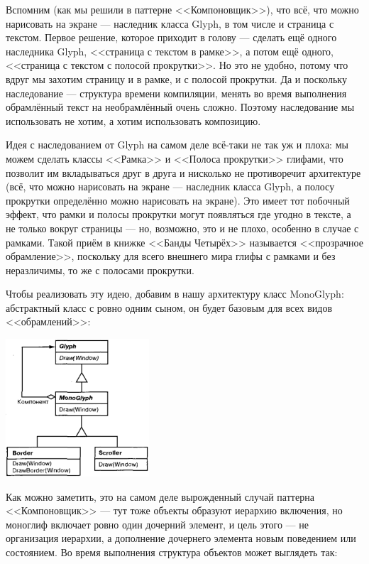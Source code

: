\documentclass{../mcstext}
\begin{document}
Вспомним (как мы решили в паттерне <<Компоновщик>>), что всё, что можно нарисовать на экране --- наследник класса Glyph, в том числе и страница с текстом. Первое решение, которое приходит в голову --- сделать ещё одного наследника Glyph, <<страница с текстом в рамке>>, а потом ещё одного, <<страница с текстом с полосой прокрутки>>. Но это не удобно, потому что вдруг мы захотим страницу и в рамке, и с полосой прокрутки. Да и поскольку наследование --- структура времени компиляции, менять во время выполнения обрамлённый текст на необрамлённый очень сложно. Поэтому наследование мы использовать не хотим, а хотим использовать композицию. 

Идея с наследованием от Glyph на самом деле всё-таки не так уж и плоха: мы можем сделать классы <<Рамка>> и <<Полоса прокрутки>> глифами, что позволит им вкладываться друг в друга и нисколько не противоречит архитектуре (всё, что можно нарисовать на экране --- наследник класса Glyph, а полосу прокрутки определённо можно нарисовать на экране). Это имеет тот побочный эффект, что рамки и полосы прокрутки могут появляться где угодно в тексте, а не только вокруг страницы --- но, возможно, это и не плохо, особенно в случае с рамками. Такой приём в книжке <<Банды Четырёх>> называется <<прозрачное обрамление>>, поскольку для всего внешнего мира глифы с рамками и без неразличимы, то же с полосами прокрутки.

Чтобы реализовать эту идею, добавим в нашу архитектуру класс MonoGlyph: абстрактный класс с ровно одним сыном, он будет базовым для всех видов <<обрамлений>>:

\begin{center}
    \includegraphics[width=0.4\textwidth]{monoglyph.png}
\end{center}

Как можно заметить, это на самом деле вырожденный случай паттерна <<Компоновщик>> --- тут тоже объекты образуют иерархию включения, но моноглиф включает ровно один дочерний элемент, и цель этого --- не организация иерархии, а дополнение дочернего элемента новым поведением или состоянием. Во время выполнения структура объектов может выглядеть так:
\end{document}
